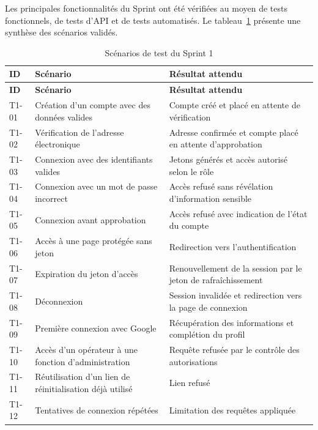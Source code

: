 Les principales fonctionnalités du Sprint ont été vérifiées au moyen de tests fonctionnels, de tests d'API et de tests automatisés. Le tableau~\ref{tab:tests-sprint1} présente une synthèse des scénarios validés.

{\small
\setlength{\tabcolsep}{5pt}
\begin{longtable}{|p{0.9cm}|p{8.2cm}|p{5.4cm}|}
\caption{Scénarios de test du Sprint 1}
\label{tab:tests-sprint1}\\
\hline
\textbf{ID} & \textbf{Scénario} & \textbf{Résultat attendu} \\
\hline
\endfirsthead

\hline
\textbf{ID} & \textbf{Scénario} & \textbf{Résultat attendu} \\
\hline
\endhead

T1-01 &
Création d'un compte avec des données valides &
Compte créé et placé en attente de vérification \\
\hline

T1-02 &
Vérification de l'adresse électronique &
Adresse confirmée et compte placé en attente d'approbation \\
\hline

T1-03 &
Connexion avec des identifiants valides &
Jetons générés et accès autorisé selon le rôle \\
\hline

T1-04 &
Connexion avec un mot de passe incorrect &
Accès refusé sans révélation d'information sensible \\
\hline

T1-05 &
Connexion avant approbation &
Accès refusé avec indication de l'état du compte \\
\hline

T1-06 &
Accès à une page protégée sans jeton &
Redirection vers l'authentification \\
\hline

T1-07 &
Expiration du jeton d'accès &
Renouvellement de la session par le jeton de rafraîchissement \\
\hline

T1-08 &
Déconnexion &
Session invalidée et redirection vers la page de connexion \\
\hline

T1-09 &
Première connexion avec Google &
Récupération des informations et complétion du profil \\
\hline

T1-10 &
Accès d'un opérateur à une fonction d'administration &
Requête refusée par le contrôle des autorisations \\
\hline

T1-11 &
Réutilisation d'un lien de réinitialisation déjà utilisé &
Lien refusé \\
\hline

T1-12 &
Tentatives de connexion répétées &
Limitation des requêtes appliquée \\
\hline

\end{longtable}}

